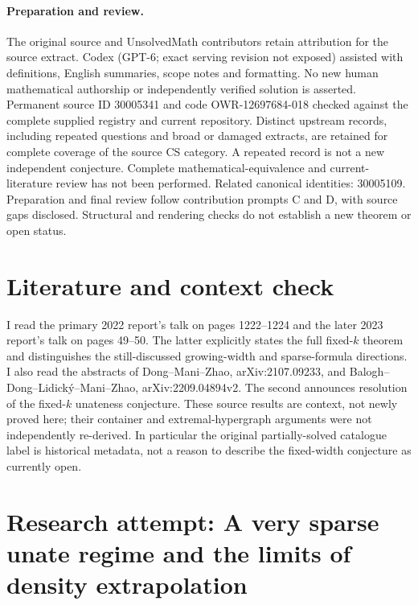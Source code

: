 \documentclass[11pt]{article}
\begin{document}
\paragraph{Preparation and review.}
The original source and UnsolvedMath contributors retain attribution for the source extract. Codex (GPT-6; exact serving revision not exposed) assisted with definitions, English summaries, scope notes and formatting. No new human mathematical authorship or independently verified solution is asserted. Permanent source ID 30005341 and code OWR-12697684-018 checked against the complete supplied registry and current repository. Distinct upstream records, including repeated questions and broad or damaged extracts, are retained for complete coverage of the source CS category. A repeated record is not a new independent conjecture. Complete mathematical-equivalence and current-literature review has not been performed. Related canonical identities: 30005109. Preparation and final review follow contribution prompts C and D, with source gaps disclosed. Structural and rendering checks do not establish a new theorem or open status.
\label{end:30005341}

\section{Literature and context check}

I read the primary 2022 report's talk on pages 1222--1224 and the later 2023
report's talk on pages 49--50. The latter explicitly states the full fixed-$k$
theorem and distinguishes the still-discussed growing-width and sparse-formula
directions. I also read the abstracts of Dong--Mani--Zhao,
arXiv:2107.09233, and Balogh--Dong--Lidick\'y--Mani--Zhao,
arXiv:2209.04894v2. The second announces resolution of the fixed-$k$ unateness
conjecture. These source results are context, not newly proved here; their
container and extremal-hypergraph arguments were not independently re-derived.
In particular the original partially-solved catalogue label is historical metadata,
not a reason to describe the fixed-width conjecture as currently open.

\section{Research attempt: A very sparse unate regime and the limits of density extrapolation}
\end{document}
